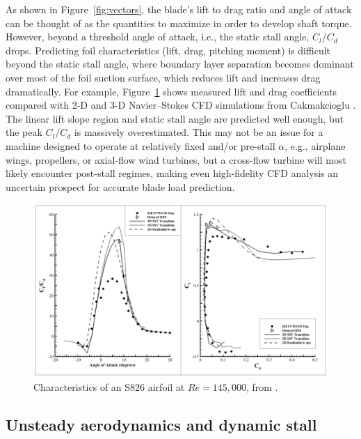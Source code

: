 As shown in Figure~\ref{fig:vectors}, the blade's lift to drag ratio and angle
of attack can be thought of as the quantities to maximize in order to develop
shaft torque. However, beyond a threshold angle of attack, i.e., the static
stall angle, $C_l/C_d$ drops. Predicting foil characteristics (lift, drag,
pitching moment) is difficult beyond the static stall angle, where boundary
layer separation becomes dominant over most of the foil suction surface, which
reduces lift and increases drag dramatically. For example,
Figure~\ref{fig:S826-perf} shows measured lift and drag coefficients compared
with 2-D and 3-D Navier--Stokes CFD simulations from Cakmakcioglu \etal
\cite{Cakmakcioglu2014}. The linear lift slope region and static stall angle are
predicted well enough, but the peak $C_l/C_d$ is massively overestimated. This
may not be an issue for a machine designed to operate at relatively fixed and/or
pre-stall $\alpha$, e.g., airplane wings, propellers, or axial-flow wind
turbines, but a cross-flow turbine will most likely encounter post-stall
regimes, making even high-fidelity CFD analysis an uncertain prospect for
accurate blade load prediction.

\begin{figure}[ht]
    \centering
    
    \includegraphics[width=\textwidth]{figures/cakmak-et-al-2014-fig8}
    
    \caption{Characteristics of an S826 airfoil at $Re=145,000$, from
        \cite{Cakmakcioglu2014}.}
    
    \label{fig:S826-perf}
\end{figure}


\subsection{Unsteady aerodynamics and dynamic stall}

